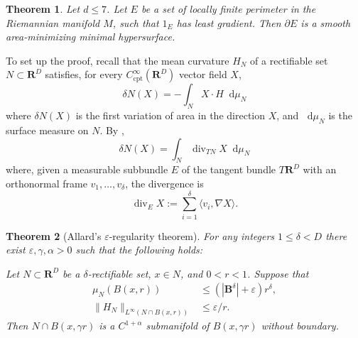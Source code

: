 \documentclass[reqno,11pt]{amsart}
\newcommand{\RR}{\mathbf{R}}
\newcommand{\Ball}{\mathbf{B}}
\newcommand*\dif{\mathop{}\!\mathrm{d}}
\DeclareMathOperator{\Div}{div}
\newcommand{\cpt}{\mathrm{cpt}}
\newtheorem{theorem}{Theorem}[section]
\theoremstyle{definition}
\numberwithin{equation}{section}
\begin{document}
\begin{theorem}\label{regularity}
Let $d \leq 7$. Let $E$ be a set of locally finite perimeter in the Riemannian manifold $M$, such that $1_E$ has least gradient.
Then $\partial E$ is a smooth area-minimizing minimal hypersurface.
\end{theorem}

To set up the proof, recall that the mean curvature $H_N$ of a rectifiable set $N \subset \RR^D$ satisfies, for every $C^\infty_\cpt(\RR^D)$ vector field $X$,
$$\delta N(X) = -\int_N X \cdot H \dif \mu_N$$
where $\delta N(X)$ is the first variation of area in the direction $X$, and $\dif \mu_N$ is the surface measure on $N$.
By \cite[Proposition 1.5]{DeLellis18}, 
$$\delta N(X) = \int_N \Div_{TN} X \dif \mu_N$$
where, given a measurable subbundle $E$ of the tangent bundle $T\RR^D$ with an orthonormal frame $v_1, \dots, v_\delta$, the divergence is 
$$\Div_E X := \sum_{i = 1}^\delta \langle v_i, \nabla X\rangle.$$

\begin{theorem}[Allard's $\varepsilon$-regularity theorem]
For any integers $1 \leq \delta < D$ there exist $\varepsilon, \gamma, \alpha > 0$ such that the following holds:

Let $N \subset \RR^D$ be a $\delta$-rectifiable set, $x \in N$, and $0 < r < 1$.
Suppose that
\begin{align}
\mu_N(B(x, r)) &\leq (|\Ball^\delta| + \varepsilon) r^\delta, \label{measure excess}\\
\|H_N\|_{L^\infty(N \cap B(x, r))} &\leq \varepsilon/r. \label{mean curvature excess}
\end{align}
Then $N \cap B(x, \gamma r)$ is a $C^{1 + \alpha}$ submanifold of $B(x, \gamma r)$ without boundary.
\end{theorem}
\end{document}
